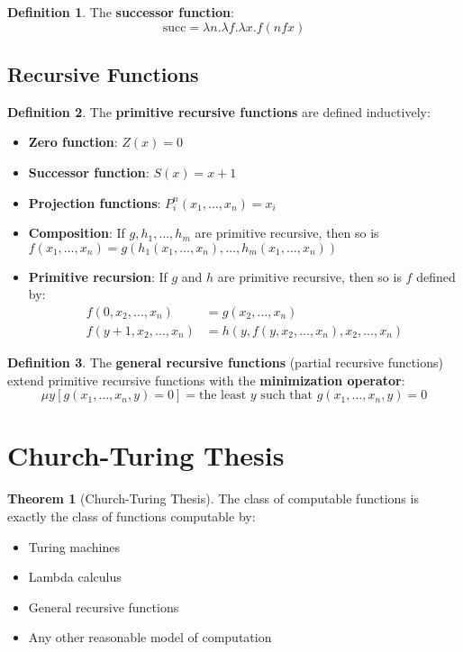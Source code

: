 \documentclass[11pt]{article}
\theoremstyle{definition}
\newtheorem{definition}{Definition}[section]
\newtheorem{theorem}{Theorem}[section]
\begin{document}
\begin{definition}
The \textbf{successor function}:
$$\text{succ} = \lambda n. \lambda f. \lambda x. f(n f x)$$
\end{definition}

\subsection{Recursive Functions}
\begin{definition}
The \textbf{primitive recursive functions} are defined inductively:
\begin{itemize}
    \item \textbf{Zero function}: $Z(x) = 0$
    \item \textbf{Successor function}: $S(x) = x + 1$
    \item \textbf{Projection functions}: $P_i^n(x_1, \ldots, x_n) = x_i$
    \item \textbf{Composition}: If $g, h_1, \ldots, h_m$ are primitive recursive, then so is $f(x_1, \ldots, x_n) = g(h_1(x_1, \ldots, x_n), \ldots, h_m(x_1, \ldots, x_n))$
    \item \textbf{Primitive recursion}: If $g$ and $h$ are primitive recursive, then so is $f$ defined by:
    \begin{align}
    f(0, x_2, \ldots, x_n) &= g(x_2, \ldots, x_n) \\
    f(y+1, x_2, \ldots, x_n) &= h(y, f(y, x_2, \ldots, x_n), x_2, \ldots, x_n)
    \end{align}
\end{itemize}
\end{definition}

\begin{definition}
The \textbf{general recursive functions} (partial recursive functions) extend primitive recursive functions with the \textbf{minimization operator}:
$$\mu y[g(x_1, \ldots, x_n, y) = 0] = \text{the least } y \text{ such that } g(x_1, \ldots, x_n, y) = 0$$
\end{definition}

\section{Church-Turing Thesis}

\begin{theorem}[Church-Turing Thesis]
The class of computable functions is exactly the class of functions computable by:
\begin{itemize}
    \item Turing machines
    \item Lambda calculus
    \item General recursive functions
    \item Any other reasonable model of computation
\end{itemize}
\end{theorem}
\end{document}
